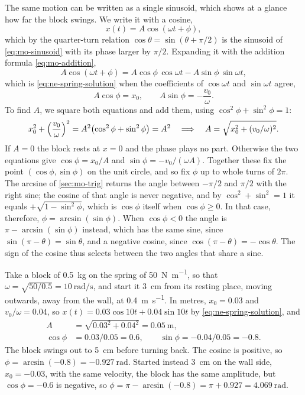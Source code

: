 The same motion can be written as a single sinusoid, which shows at a
glance how far the block swings. We write it with a cosine,
\begin{equation*}
   x(t) = A\cos(\omega t + \phi) ,
\end{equation*}
which by the quarter-turn relation $\cos\theta = \sin(\theta + \pi/2)$ is
the sinusoid of \cref{eq:mo-sinusoid} with its phase larger by $\pi/2$.
Expanding it with the addition formula \cref{eq:mo-addition},
\begin{equation*}
   A\cos(\omega t + \phi) = A\cos\phi\,\cos\omega t - A\sin\phi\,\sin\omega t ,
\end{equation*}
which is \cref{eq:ne-spring-solution} when the coefficients of $\cos\omega
t$ and $\sin\omega t$ agree,
\begin{equation*}
   A\cos\phi = x_0, \qquad A\sin\phi = -\frac{v_0}{\omega} .
\end{equation*}
To find $A$, we square both equations and add them, using $\cos^2\phi +
\sin^2\phi = 1$:
\begin{equation*}
   x_0^2 + \Bigl(\frac{v_0}{\omega}\Bigr)^2
   = A^2\bigl(\cos^2\phi + \sin^2\phi\bigr) = A^2
   \quad\Longrightarrow\quad
   A = \sqrt{x_0^2 + (v_0/\omega)^2} .
\end{equation*}
If $A = 0$ the block rests at $x = 0$ and the phase plays no part.
Otherwise the two equations give $\cos\phi = x_0/A$ and $\sin\phi =
-v_0/(\omega A)$. Together these fix the point $(\cos\phi, \sin\phi)$ on
the unit circle, and so fix $\phi$ up to whole turns of $2\pi$. The
arcsine of \cref{sec:mo-trig} returns the angle between $-\pi/2$ and
$\pi/2$ with the right sine; the cosine of that angle is never negative,
and by $\cos^2 + \sin^2 = 1$ it equals $+\sqrt{1 - \sin^2\phi}$, which is
$\cos\phi$ itself when $\cos\phi \ge 0$. In that case, therefore, $\phi =
\arcsin(\sin\phi)$.
When $\cos\phi < 0$ the angle is $\pi - \arcsin(\sin\phi)$ instead, which
has the same sine, since $\sin(\pi - \theta) = \sin\theta$, and a
negative cosine, since $\cos(\pi - \theta) = -\cos\theta$. The sign of
the cosine thus selects between the two angles that share a sine.

Take a block of \SI{0.5}{\kilogram} on the spring of
\SI{50}{\newton\per\metre}, so that $\omega = \sqrt{50/0.5} =
\SI{10}{\radian\per\second}$, and start it \SI{3}{\centi\metre} from its
resting place, moving outwards, away from the wall, at
\SI{0.4}{\metre\per\second}. In metres,
$x_0 = 0.03$ and $v_0/\omega = 0.04$, so $x(t) = 0.03\cos 10t +
0.04\sin 10t$ by \cref{eq:ne-spring-solution}, and
\begin{align*}
   A &= \sqrt{0.03^2 + 0.04^2} = \SI{0.05}{\metre} ,\\
   \cos\phi &= 0.03/0.05 = 0.6, \qquad
   \sin\phi = -0.04/0.05 = -0.8 .
\end{align*}
The block swings out to \SI{5}{\centi\metre} before turning back. The
cosine is positive, so $\phi = \arcsin(-0.8) = \SI{-0.927}{\radian}$.
Started instead \SI{3}{\centi\metre} on the wall side, $x_0 = -0.03$,
with the same velocity, the block has the same amplitude, but $\cos\phi =
-0.6$ is negative, so $\phi = \pi - \arcsin(-0.8) = \pi + 0.927 =
\SI{4.069}{\radian}$.

